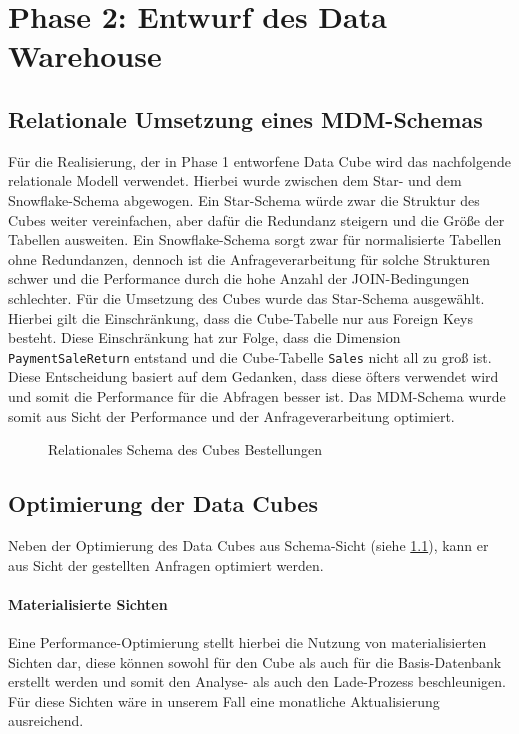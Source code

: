 \section{Phase 2: Entwurf des Data Warehouse}

\subsection{Relationale Umsetzung eines MDM-Schemas}
\label{ref:mdmSchema}

Für die Realisierung, der in Phase 1 entworfene Data Cube wird das nachfolgende relationale Modell verwendet.
Hierbei wurde zwischen dem Star- und dem Snowflake-Schema abgewogen. 
Ein Star-Schema würde zwar die Struktur des Cubes weiter vereinfachen, aber dafür die Redundanz steigern und die Größe der Tabellen ausweiten. 
Ein Snowflake-Schema sorgt zwar für normalisierte Tabellen ohne Redundanzen, dennoch ist die Anfrageverarbeitung für solche Strukturen schwer und die Performance durch die hohe Anzahl der JOIN-Bedingungen schlechter.
Für die Umsetzung des Cubes wurde das Star-Schema ausgewählt. Hierbei gilt die Einschränkung, dass die Cube-Tabelle nur aus Foreign Keys besteht.
Diese Einschränkung hat zur Folge, dass die Dimension \texttt{PaymentSaleReturn} entstand und die Cube-Tabelle \texttt{Sales} nicht all zu groß ist. Diese Entscheidung basiert auf dem Gedanken, dass diese öfters verwendet wird und somit die Performance für die Abfragen besser ist.
Das MDM-Schema wurde somit aus Sicht der Performance und der Anfrageverarbeitung optimiert.

\begin{figure}[htbp] 
  \centering
    
    \caption{Relationales Schema des Cubes Bestellungen}
\end{figure}

\pagebreak

\subsection{Optimierung der Data Cubes}
\label{ref:optimierung}
Neben der Optimierung des Data Cubes aus Schema-Sicht (siehe \ref{ref:mdmSchema}), kann er aus Sicht der gestellten Anfragen optimiert werden.

\paragraph{Materialisierte Sichten} Eine Performance-Optimierung stellt hierbei die Nutzung von materialisierten Sichten dar, diese können sowohl für den Cube als auch für die Basis-Datenbank erstellt werden und somit den Analyse- als auch den Lade-Prozess beschleunigen. 
Für diese Sichten wäre in unserem Fall eine monatliche Aktualisierung ausreichend.


